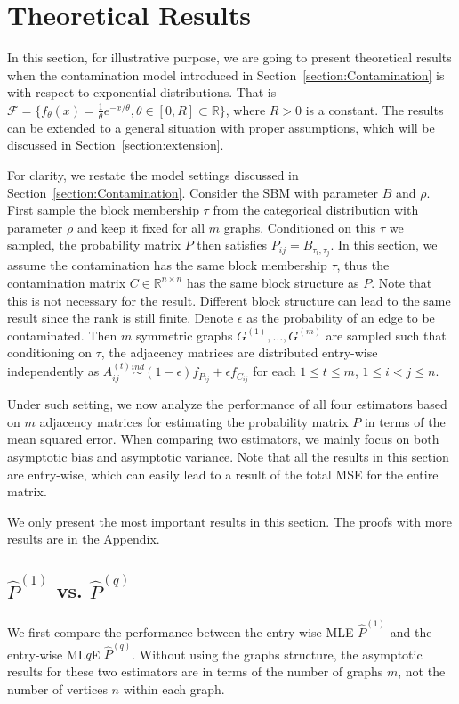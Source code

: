 \documentclass[a4paper]{article}
\renewcommand{\hat}{\widehat}
\begin{document}
\section{Theoretical Results}
\label{section:theory}
In this section, for illustrative purpose, we are going to present theoretical results when the contamination model introduced in Section~\ref{section:Contamination} is with respect to exponential distributions. That is $\mathcal{F} = \{ f_{\theta}(x) = \frac{1}{\theta} e^{-x/\theta}, \theta \in [0, R] \subset \mathbb{R} \}$, where $R > 0$ is a constant. The results can be extended to a general situation with proper assumptions, which will be discussed in Section~\ref{section:extension}.

For clarity, we restate the model settings discussed in Section~\ref{section:Contamination}. Consider the SBM with parameter $B$ and $\rho$. First sample the block membership $\tau$ from the categorical distribution with parameter $\rho$ and keep it fixed for all $m$ graphs. Conditioned on this $\tau$ we sampled, the probability matrix $P$ then satisfies $P_{ij} = B_{\tau_i, \tau_j}$. In this section, we assume the contamination has the same block membership $\tau$, thus the contamination matrix $C \in \mathbb{R}^{n \times n}$ has the same block structure as $P$. Note that this is not necessary for the result. Different block structure can lead to the same result since the rank is still finite. Denote $\epsilon$ as the probability of an edge to be contaminated. Then $m$ symmetric graphs $G^{(1)}, \dotsc, G^{(m)}$  are sampled such that conditioning on $\tau$, the adjacency matrices are distributed entry-wise independently as $A^{(t)}_{ij} \stackrel{ind}{\sim} (1-\epsilon) f_{P_{ij}} + \epsilon f_{C_{ij}}$ for each $1 \le t \le m$, $1 \le i < j \le n$. 

Under such setting, we now analyze the performance of all four estimators based on $m$ adjacency matrices for estimating the probability matrix $P$ in terms of the mean squared error. When comparing two estimators, we mainly focus on both asymptotic bias and asymptotic variance. Note that all the results in this section are entry-wise, which can easily lead to a result of the total MSE for the entire matrix.

We only present the most important results in this section. The proofs with more results are in the Appendix.

\subsection{$\hat{P}^{(1)}$ vs. $\hat{P}^{(q)}$}
\label{section:MLEvsMLqE}
We first compare the performance between the entry-wise MLE $\hat{P}^{(1)}$ and the entry-wise ML$q$E $\hat{P}^{(q)}$. Without using the graphs structure, the asymptotic results for these two estimators are in terms of the number of graphs $m$, not the number of vertices $n$ within each graph.
\end{document}
